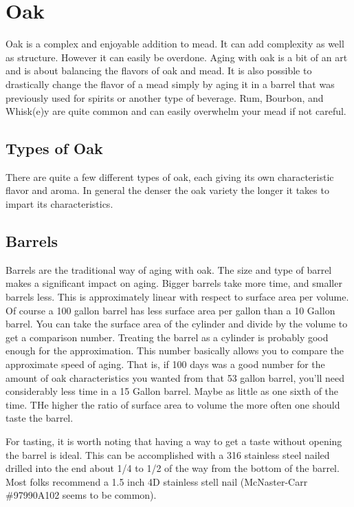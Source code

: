 \section{Oak}
  Oak is  a complex and enjoyable addition to mead. It can add complexity as well as structure. However it can easily
  be overdone. Aging with oak is a bit of an art and is about balancing the flavors of oak and mead. It is also
  possible to drastically change the flavor of a mead simply by aging it in a barrel that was previously used
  for spirits or another type of beverage. Rum, Bourbon, and Whisk(e)y are quite common and can easily overwhelm
  your mead if not careful.


 \subsection{Types of Oak}
  There are quite a few different types of oak, each giving its own characteristic flavor and aroma.
  In general the denser the oak variety the longer it takes to impart its characteristics. 


 \subsection{Barrels}
  Barrels are the traditional way of aging with oak. The size and type of barrel makes a significant impact on
  aging. Bigger barrels take more time, and smaller barrels less. This is approximately linear with respect to
  surface area per volume. Of course a 100 gallon barrel has less surface area per gallon than a 10 Gallon barrel.
  You can take the surface area of the cylinder and divide by the volume to get a comparison number. 
  Treating the barrel as a cylinder is probably good enough for the approximation.
  This number
  basically allows you to compare the approximate speed of aging. That is, if 100 days was a good number for the
  amount of oak characteristics you wanted from that 53 gallon barrel, you'll need considerably less time in a 
  15 Gallon barrel. Maybe as little as one sixth of the time. THe higher the ratio of surface area to volume the more 
  often one should taste the barrel.

  For tasting, it is worth noting that having a way to get a taste without opening the barrel is ideal. This can
  be accomplished with a 316 stainless steel nailed drilled into the end about 1/4 to 1/2 of the way from the bottom
  of the barrel. Most folks recommend a 1.5 inch 4D stainless stell nail (McNaster-Carr \#97990A102 seems to be common).

